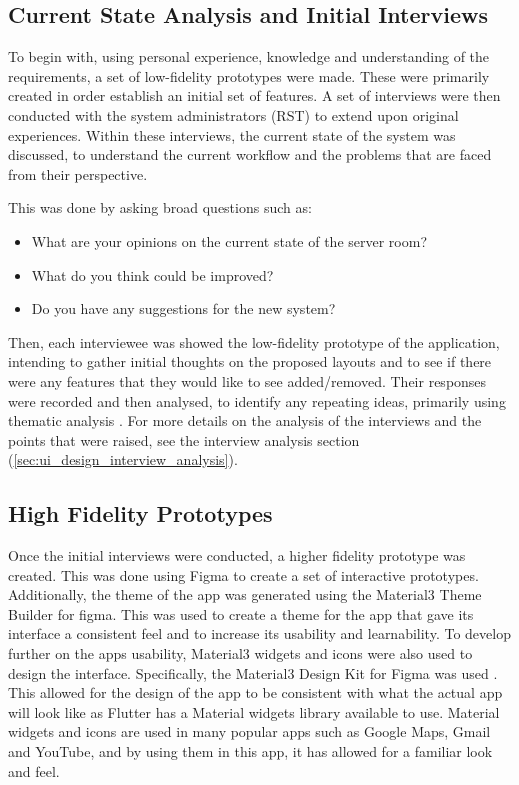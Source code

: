 \documentclass [11pt,a4paper]{article}
\begin{document}
\subsection{Current State Analysis and Initial Interviews}
\label{sec:current_state_analysis}

To begin with, using personal experience, knowledge and understanding of the requirements, a set of low-fidelity prototypes were made. These were primarily created in order establish an initial set of features. A set of interviews were then conducted with the system administrators (RST) to extend upon original experiences.  Within these interviews, the current state of the system was discussed, to understand the current workflow and the problems that are faced from their perspective.

This was done by asking broad questions such as:

\begin{itemize}
    \item What are your opinions on the current state of the server room?
    \item What do you think could be improved?
    \item Do you have any suggestions for the new system?
\end{itemize}

Then, each interviewee was showed the low-fidelity prototype of the application, intending to gather initial thoughts on the proposed layouts and to see if there were any features that they would like to see added/removed. Their responses were recorded and then analysed, to identify any repeating ideas, primarily using thematic analysis \cite{thematicAnal}. For more details on the analysis of the interviews and the points that were raised, see the interview analysis section (\ref{sec:ui_design_interview_analysis}).

\subsection{High Fidelity Prototypes}
\label{sec:high_fidelity_prototypes}
Once the initial interviews were conducted, a higher fidelity prototype was created. This was done using Figma to create a set of interactive prototypes. Additionally, the theme of the app was generated using the Material3 Theme Builder for figma\cite{material3ColourTool}. This was used to create a theme for the app that gave its interface a consistent feel and to increase its usability and learnability. To develop further on the apps usability, Material3 widgets and icons were also used to design the interface. Specifically, the Material3 Design Kit for Figma was used \cite{material3DesignKit}. This allowed for the design of the app to be consistent with what the actual app will look like as Flutter has a Material widgets library available to use. Material widgets and icons are used in many popular apps such as Google Maps, Gmail and YouTube, and by using them in this app, it has allowed for a familiar look and feel. 
\end{document}
